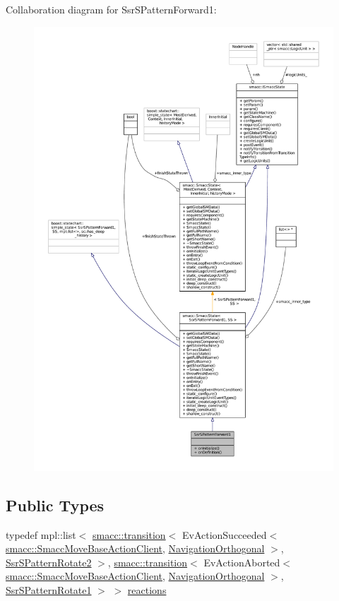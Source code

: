 Collaboration diagram for Ssr\+S\+Pattern\+Forward1\+:
\nopagebreak
\begin{figure}[H]
\begin{center}
\leavevmode
\includegraphics[width=350pt]{structSsrSPatternForward1__coll__graph}
\end{center}
\end{figure}
\subsection*{Public Types}
\begin{DoxyCompactItemize}
\item 
typedef mpl\+::list$<$ \hyperlink{classsmacc_1_1transition}{smacc\+::transition}$<$ Ev\+Action\+Succeeded$<$ \hyperlink{classsmacc_1_1SmaccMoveBaseActionClient}{smacc\+::\+Smacc\+Move\+Base\+Action\+Client}, \hyperlink{classNavigationOrthogonal}{Navigation\+Orthogonal} $>$, \hyperlink{structSsrSPatternRotate2}{Ssr\+S\+Pattern\+Rotate2} $>$, \hyperlink{classsmacc_1_1transition}{smacc\+::transition}$<$ Ev\+Action\+Aborted$<$ \hyperlink{classsmacc_1_1SmaccMoveBaseActionClient}{smacc\+::\+Smacc\+Move\+Base\+Action\+Client}, \hyperlink{classNavigationOrthogonal}{Navigation\+Orthogonal} $>$, \hyperlink{structSsrSPatternRotate1}{Ssr\+S\+Pattern\+Rotate1} $>$ $>$ \hyperlink{structSsrSPatternForward1_ac75b9df8ec5d172b84ecdccf7bd4d094}{reactions}
\end{DoxyCompactItemize}
